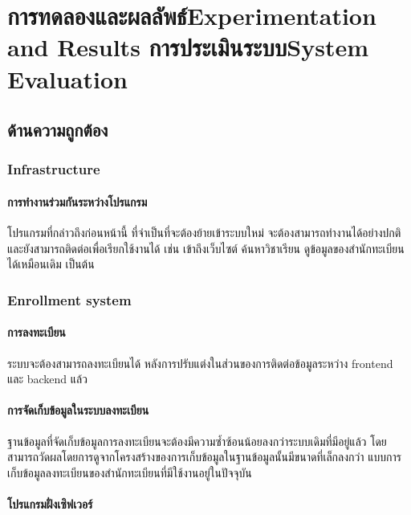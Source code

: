 \chapter{\ifproject%
\ifcpe การทดลองและผลลัพธ์\else Experimentation and Results\fi
\else%
\ifcpe การประเมินระบบ\else System Evaluation\fi
\fi}

\section{ด้านความถูกต้อง}

\subsection{Infrastructure}

\subsubsection{การทำงานร่วมกันระหว่างโปรแกรม}

โปรแกรมที่กล่าวถึงก่อนหน้านี้ ที่จำเป็นที่จะต้องย้ายเข้าระบบใหม่ จะต้องสามารถทำงานได้อย่างปกติ และยังสามารถติดต่อเพื่อเรียกใช้งานได้ เช่น เข้าถึงเว็บไซต์ ค้นหาวิชาเรียน ดูข้อมูลของสำนักทะเบียนได้เหมือนเดิม เป็นต้น

\subsection{Enrollment system}

\subsubsection{การลงทะเบียน}

ระบบจะต้องสามารถลงทะเบียนได้ หลังการปรับแต่งในส่วนของการติดต่อข้อมูลระหว่าง frontend และ backend แล้ว

\subsubsection{การจัดเก็บข้อมูลในระบบลงทะเบียน}

ฐานข้อมูลที่จัดเก็บข้อมูลการลงทะเบียนจะต้องมีความซ้ำซ้อนน้อยลงกว่าระบบเดิมที่มีอยู่แล้ว โดยสามารถวัดผลโดยการดูจากโครงสร้างของการเก็บข้อมูลในฐานข้อมูลนั้นมีขนาดที่เล็กลงกว่า แบบการเก็บข้อมูลลงทะเบียนของสำนักทะเบียนที่มีใช้งานอยู่ในปัจจุบัน

\subsubsection{โปรแกรมฝั่งเซิฟเวอร์}

